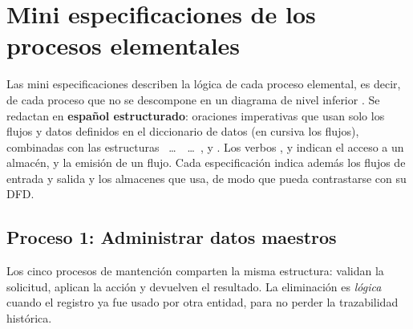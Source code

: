 \clearpage
\section{Mini especificaciones de los procesos elementales}
\label{sec:minispec}

Las mini especificaciones describen la lógica de cada proceso elemental, es decir, de cada
proceso que no se descompone en un diagrama de nivel inferior \parencite{demarco1979}. Se
redactan en \textbf{español estructurado}: oraciones imperativas que usan solo los flujos y
datos definidos en el diccionario de datos (en cursiva los flujos), combinadas con las
estructuras ~\dots~~\dots~,  y
. Los verbos ,  y  indican el acceso a un
almacén, y  la emisión de un flujo. Cada especificación indica además los flujos
de entrada y salida y los almacenes que usa, de modo que pueda contrastarse con su DFD.

\subsection{Proceso 1: Administrar datos maestros}

Los cinco procesos de mantención comparten la misma estructura: validan la solicitud,
aplican la acción y devuelven el resultado. La eliminación es \emph{lógica} cuando el registro
ya fue usado por otra entidad, para no perder la trazabilidad histórica.

